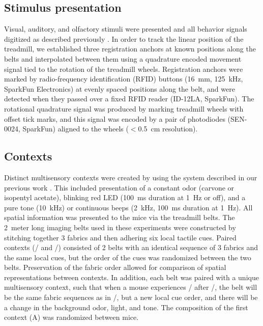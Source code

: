 \subsection{Stimulus presentation}
Visual, auditory, and olfactory stimuli were presented and all behavior signals digitized as described previously \citep{Danielson2016b, Kaifosh2013, Lovett-Barron2014}. In order to track the linear position of the treadmill, we established three registration anchors at known positions along the belts and interpolated between them using a quadrature encoded movement signal tied to the rotation of the treadmill wheels. Registration anchors were marked by radio-frequency identification (RFID) buttons (16~mm, 125~kHz, SparkFun Electronics) at evenly spaced positions along the belt, and were detected when they passed over a fixed RFID reader (ID-12LA, SparkFun).  The rotational quadrature signal was produced by marking treadmill wheels with offset tick marks, and this signal was encoded by a pair of photodiodes (SEN-0024, SparkFun) aligned to the wheels ($<$0.5~cm resolution).
\subsection{Contexts}\label{sec:df:methods:contexts}
Distinct multisensory contexts were created by using the system described in our previous work \citep{Lovett-Barron2014}. This included presentation of a constant odor (carvone or isopentyl acetate), blinking red LED (100~ms duration at 1~Hz or off), and a pure tone (10~kHz) or continuous beeps (2~kHz, 100~ms duration at 1~Hz). All spatial information was presented to the mice via the treadmill belts. The 2~meter long imaging belts used in these experiments were constructed by stitching together 3 fabrics and then adhering six local tactile cues. Paired contexts (\A/ and \Aprime/) consisted of 2 belts with an identical sequence of 3 fabrics and the same local cues, but the order of the cues was randomized between the two belts. Preservation of the fabric order allowed for comparison of spatial representations between contexts. In addition, each belt was paired with a unique multisensory context, such that when a mouse experiences \Aprime/ after \A/, the belt will be the same fabric sequences as in \A/, but a new local cue order, and there will be a change in the background odor, light, and tone. The composition of the first context (A) was randomized between mice.
